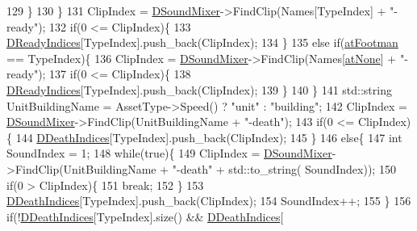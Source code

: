 \begin{DoxyCode}
129             \}
130         \}
131         ClipIndex = \hyperlink{classCSoundEventRenderer_a5abf598a7e8783d9cc78e0d33a65c9c2}{DSoundMixer}->FindClip(Names[TypeIndex] + \textcolor{stringliteral}{"-ready"});
132         \textcolor{keywordflow}{if}(0 <= ClipIndex)\{
133             \hyperlink{classCSoundEventRenderer_a68d2be3282880d4d7b47ee94b0a30139}{DReadyIndices}[TypeIndex].push\_back(ClipIndex);
134         \}
135         \textcolor{keywordflow}{else} \textcolor{keywordflow}{if}(\hyperlink{GameDataTypes_8h_a5600d4fc433b83300308921974477fecad586e8ff9ee846d22630c2066e8fb7c2}{atFootman} == TypeIndex)\{
136             ClipIndex = \hyperlink{classCSoundEventRenderer_a5abf598a7e8783d9cc78e0d33a65c9c2}{DSoundMixer}->FindClip(Names[\hyperlink{GameDataTypes_8h_a5600d4fc433b83300308921974477feca82fb51718e2c00981a2d37bc6fe92593}{atNone}] + \textcolor{stringliteral}{"-ready"});
137             \textcolor{keywordflow}{if}(0 <= ClipIndex)\{
138                 \hyperlink{classCSoundEventRenderer_a68d2be3282880d4d7b47ee94b0a30139}{DReadyIndices}[TypeIndex].push\_back(ClipIndex);
139             \}
140         \}
141         std::string UnitBuildingName = AssetType->Speed() ? \textcolor{stringliteral}{"unit"} : \textcolor{stringliteral}{"building"};
142         ClipIndex = \hyperlink{classCSoundEventRenderer_a5abf598a7e8783d9cc78e0d33a65c9c2}{DSoundMixer}->FindClip(UnitBuildingName + \textcolor{stringliteral}{"-death"});
143         \textcolor{keywordflow}{if}(0 <= ClipIndex)\{
144             \hyperlink{classCSoundEventRenderer_a6b250e51c42870715c12ea47b99b9594}{DDeathIndices}[TypeIndex].push\_back(ClipIndex);
145         \}
146         \textcolor{keywordflow}{else}\{
147             \textcolor{keywordtype}{int} SoundIndex = 1;
148             \textcolor{keywordflow}{while}(\textcolor{keyword}{true})\{
149                 ClipIndex = \hyperlink{classCSoundEventRenderer_a5abf598a7e8783d9cc78e0d33a65c9c2}{DSoundMixer}->FindClip(UnitBuildingName + \textcolor{stringliteral}{"-death"} + std::to\_string(
      SoundIndex));
150                 \textcolor{keywordflow}{if}(0 > ClipIndex)\{
151                     \textcolor{keywordflow}{break};   
152                 \}
153                 \hyperlink{classCSoundEventRenderer_a6b250e51c42870715c12ea47b99b9594}{DDeathIndices}[TypeIndex].push\_back(ClipIndex);
154                 SoundIndex++;
155             \}
156             \textcolor{keywordflow}{if}(!\hyperlink{classCSoundEventRenderer_a6b250e51c42870715c12ea47b99b9594}{DDeathIndices}[TypeIndex].size() && \hyperlink{classCSoundEventRenderer_a6b250e51c42870715c12ea47b99b9594}{DDeathIndices}[

\end{DoxyCode}
